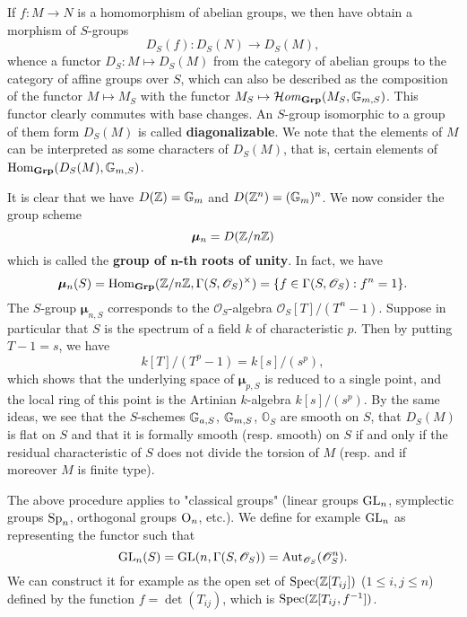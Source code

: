 If $f:M\to N$ is a homomorphism of abelian groups, we then have obtain a morphism of $S$-groups
\[D_S(f):D_S(N)\to D_S(M),\]
whence a functor $D_S:M\mapsto D_S(M)$ from the category of abelian groups to the category of affine groups over $S$, which can also be described as the composition of the functor $M\mapsto M_S$ with the functor $M_S\mapsto\operatorname{\mathcal{H}\hspace*{-0.4pt}\textit{om}\hspace{0.5pt}}_{\mathbf{Grp}}(M_S,\mathbb{G}_{m,S})$. This functor clearly commutes with base changes. An $S$-group isomorphic to a group of them form $D_S(M)$ is called \textbf{diagonalizable}. We note that the elements of $M$ can be interpreted as some characters of $D_S(M)$, that is, certain elements of $\mathrm{Hom}_{\mathbf{Grp}}(D_S(M),\mathbb{G}_{m,S})$.
\begin{example}
It is clear that we have $D(\mathbb{Z})=\mathbb{G}_m$ and $D(\mathbb{Z}^n)=(\mathbb{G}_m)^n$. We now consider the group scheme
\[\bm{\mu}_n=D(\mathbb{Z}/n\mathbb{Z})\]
which is called the \textbf{group of $\bm{n}$-th roots of unity}. In fact, we have
\[\bm{\mu}_n(S)=\mathrm{Hom}_{\mathbf{Grp}}(\mathbb{Z}/n\mathbb{Z},\Gamma(S,\mathscr{O}_S)^\times)=\{f\in\Gamma(S,\mathscr{O}_S):f^n=1\}.\]
The $S$-group $\bm{\mu}_{n,S}$ corresponds to the $\mathscr{O}_S$-algebra $\mathscr{O}_S[T]/(T^n-1)$. Suppose in particular that $S$ is the spectrum of a field $k$ of characteristic $p$. Then by putting $T-1=s$, we have
\[k[T]/(T^p-1)=k[s]/(s^p),\]
which shows that the underlying space of $\bm{\mu}_{p,S}$ is reduced to a single point, and the local ring of this point is the Artinian $k$-algebra $k[s]/(s^p)$. By the same ideas, we see that the $S$-schemes $\mathbb{G}_{a,S}$, $\mathbb{G}_{m,S}$, $\mathbb{O}_S$ are smooth on $S$, that $D_S(M)$ is flat on $S$ and that it is formally smooth (resp. smooth) on $S$ if and only if the residual characteristic of $S$ does not divide the torsion of $M$ (resp. and if moreover $M$ is finite type).
\end{example}
\begin{example}
The above procedure applies to "classical groups" (linear groups $\mathrm{GL}_n$, symplectic groups $\mathrm{Sp}_n$, orthogonal groups $\mathrm{O}_n$, etc.). We define for example $\mathrm{GL}_n$ as representing the functor such that
\[\mathrm{GL}_n(S)=\mathrm{GL}(n,\Gamma(S,\mathscr{O}_S))=\mathrm{Aut}_{\mathscr{O}_S}(\mathscr{O}_S^n).\]
We can construct it for example as the open set of $\mathrm{Spec}(\mathbb{Z}[T_{ij}])$ ($1\leq i,j\leq n$) defined by the function $f=\det(T_{ij})$, which is $\mathrm{Spec}(\mathbb{Z}[T_{ij},f^{-1}])$.
\end{example}

